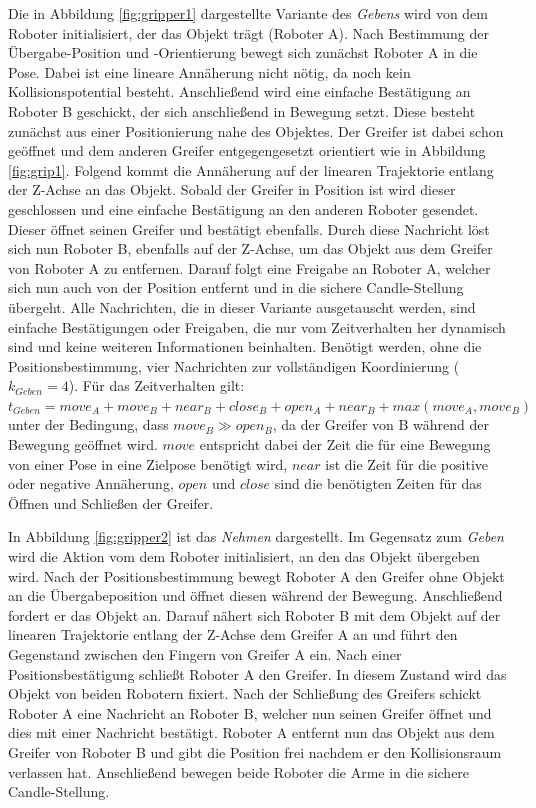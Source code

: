 Die in Abbildung \ref{fig:gripper1} dargestellte Variante des \textit{Gebens} wird von dem Roboter initialisiert, der das Objekt trägt (Roboter A). Nach Bestimmung der Übergabe-Position und -Orientierung bewegt sich zunächst Roboter A in die Pose. Dabei ist eine lineare Annäherung nicht nötig, da noch kein Kollisionspotential besteht. Anschließend wird eine einfache Bestätigung an Roboter B geschickt, der sich anschließend in Bewegung setzt. Diese besteht zunächst aus einer Positionierung nahe des Objektes. Der Greifer ist dabei schon geöffnet und dem anderen Greifer entgegengesetzt orientiert wie in Abbildung \ref{fig:grip1}. Folgend kommt die Annäherung auf der linearen Trajektorie entlang der Z-Achse an das Objekt. Sobald der Greifer in Position ist wird dieser geschlossen und eine einfache Bestätigung an den anderen Roboter gesendet. Dieser öffnet seinen Greifer und bestätigt ebenfalls. Durch diese Nachricht löst sich nun Roboter B, ebenfalls auf der Z-Achse, um das Objekt aus dem Greifer von Roboter A zu entfernen. Darauf folgt eine Freigabe an Roboter A, welcher sich nun auch von der Position entfernt und in die sichere Candle-Stellung übergeht. Alle Nachrichten, die in dieser Variante ausgetauscht werden, sind einfache Bestätigungen oder Freigaben, die nur vom Zeitverhalten her dynamisch sind und keine weiteren Informationen beinhalten. Benötigt werden, ohne die Positionsbestimmung, vier Nachrichten zur vollständigen Koordinierung ($k_{Geben} = 4$). Für das Zeitverhalten gilt: $t_{Geben} = move_A + move_B + near_B + close_B + open_A + near_B + max(move_A, move_B)$ unter der Bedingung, dass $move_B \gg open_B$, da der Greifer von B während der Bewegung geöffnet wird. $move$ entspricht dabei der Zeit die für eine Bewegung von einer Pose in eine Zielpose benötigt wird, $near$ ist die Zeit für die positive oder negative Annäherung, $open$ und $close$ sind die benötigten Zeiten für das Öffnen und Schließen der Greifer.

In Abbildung \ref{fig:gripper2} ist das \textit{Nehmen} dargestellt. Im Gegensatz zum \textit{Geben} wird die Aktion vom dem Roboter initialisiert, an den das Objekt übergeben wird. Nach der Positionsbestimmung bewegt Roboter A den Greifer ohne Objekt an die Übergabeposition und öffnet diesen während der Bewegung. Anschließend fordert er das Objekt an. Darauf nähert sich Roboter B mit dem Objekt auf der linearen Trajektorie entlang der Z-Achse dem Greifer A an und führt den Gegenstand zwischen den Fingern von Greifer A ein. Nach einer Positionsbestätigung schließt Roboter A den Greifer. In diesem Zustand wird das Objekt von beiden Robotern fixiert. Nach der Schließung des Greifers schickt Roboter A eine Nachricht an Roboter B, welcher nun seinen Greifer öffnet und dies mit einer Nachricht bestätigt. Roboter A entfernt nun das Objekt aus dem Greifer von Roboter B und gibt die Position frei nachdem er den Kollisionsraum verlassen hat. Anschließend bewegen beide Roboter die Arme in die sichere Candle-Stellung.

